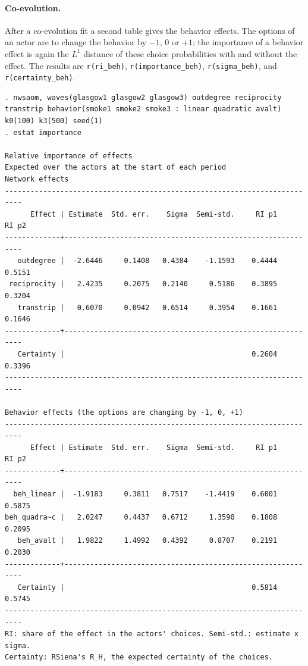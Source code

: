\paragraph{Co-evolution.} After a co-evolution fit a second table gives the behavior effects. The options of an actor are to change the behavior by $-1$, $0$ or $+1$; the importance of a behavior effect is again the $L^1$ distance of these choice probabilities with and without the effect. The results are \texttt{r(ri\_beh)}, \texttt{r(importance\_beh)}, \texttt{r(sigma\_beh)},  and \texttt{r(certainty\_beh)}.
\begin{lstlisting}
. nwsaom, waves(glasgow1 glasgow2 glasgow3) outdegree reciprocity transtrip behavior(smoke1 smoke2 smoke3 : linear quadratic avalt) k0(100) k3(500) seed(1)
. estat importance

Relative importance of effects
Expected over the actors at the start of each period
Network effects
--------------------------------------------------------------------------
      Effect | Estimate  Std. err.    Sigma  Semi-std.     RI p1     RI p2
-------------+------------------------------------------------------------
   outdegree |  -2.6446     0.1408   0.4384    -1.1593    0.4444    0.5151
 reciprocity |   2.4235     0.2075   0.2140     0.5186    0.3895    0.3204
   transtrip |   0.6070     0.0942   0.6514     0.3954    0.1661    0.1646
-------------+------------------------------------------------------------
   Certainty |                                            0.2604    0.3396
--------------------------------------------------------------------------

Behavior effects (the options are changing by -1, 0, +1)
--------------------------------------------------------------------------
      Effect | Estimate  Std. err.    Sigma  Semi-std.     RI p1     RI p2
-------------+------------------------------------------------------------
  beh_linear |  -1.9183     0.3811   0.7517    -1.4419    0.6001    0.5875
beh_quadra~c |   2.0247     0.4437   0.6712     1.3590    0.1808    0.2095
   beh_avalt |   1.9822     1.4992   0.4392     0.8707    0.2191    0.2030
-------------+------------------------------------------------------------
   Certainty |                                            0.5814    0.5745
--------------------------------------------------------------------------
RI: share of the effect in the actors' choices. Semi-std.: estimate x sigma.
Certainty: RSiena's R_H, the expected certainty of the choices.
\end{lstlisting}

